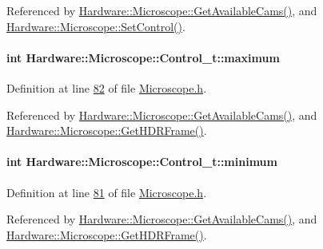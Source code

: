 Referenced by \hyperlink{_microscope_8cpp_source_l00047}{Hardware\+::\+Microscope\+::\+Get\+Available\+Cams()}, and \hyperlink{_microscope_8cpp_source_l00374}{Hardware\+::\+Microscope\+::\+Set\+Control()}.

\hypertarget{struct_hardware_1_1_microscope_1_1_control__t_ac9b27cf29b495f9539931166cc3b41e2}{}
\paragraph[{maximum}]{\setlength{\rightskip}{0pt plus 5cm}int Hardware\+::\+Microscope\+::\+Control\+\_\+t\+::maximum}\label{struct_hardware_1_1_microscope_1_1_control__t_ac9b27cf29b495f9539931166cc3b41e2}


Definition at line \hyperlink{_microscope_8h_source_l00082}{82} of file \hyperlink{_microscope_8h_source}{Microscope.\+h}.



Referenced by \hyperlink{_microscope_8cpp_source_l00047}{Hardware\+::\+Microscope\+::\+Get\+Available\+Cams()}, and \hyperlink{_microscope_8cpp_source_l00333}{Hardware\+::\+Microscope\+::\+Get\+H\+D\+R\+Frame()}.

\hypertarget{struct_hardware_1_1_microscope_1_1_control__t_a3695825b54ec92981f3d9f7f5a6c6cac}{}
\paragraph[{minimum}]{\setlength{\rightskip}{0pt plus 5cm}int Hardware\+::\+Microscope\+::\+Control\+\_\+t\+::minimum}\label{struct_hardware_1_1_microscope_1_1_control__t_a3695825b54ec92981f3d9f7f5a6c6cac}


Definition at line \hyperlink{_microscope_8h_source_l00081}{81} of file \hyperlink{_microscope_8h_source}{Microscope.\+h}.



Referenced by \hyperlink{_microscope_8cpp_source_l00047}{Hardware\+::\+Microscope\+::\+Get\+Available\+Cams()}, and \hyperlink{_microscope_8cpp_source_l00333}{Hardware\+::\+Microscope\+::\+Get\+H\+D\+R\+Frame()}.

